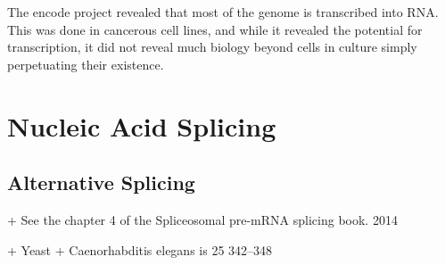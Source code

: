 
The encode project revealed that most of the genome is transcribed into RNA. This was done in cancerous cell lines, and while it revealed the potential for transcription, it did not reveal much biology beyond cells in culture simply perpetuating their existence. 

\section{Nucleic Acid Splicing}
\subsection{Alternative Splicing}





     + See the chapter 4 of the Spliceosomal pre-mRNA splicing book. 2014

     + Yeast
     + Caenorhabditis elegans  is 25%
     342–348


